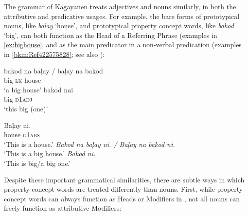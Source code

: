 The grammar of Kagayanen treats adjectives and nouns similarly, in both the attributive and predicative usages. For example, the bare forms of prototypical nouns, like \textit{baļay} ‘house’, and prototypical property concept words, like \textit{bakod} ‘big’, can both function as the Head of a Referring Phrase (examples in \ref{ex:bighouse}, and as the main predicator in a non-verbal predication (examples in \ref{bkm:Ref422575828}; see also ):

\ea 
\label{ex:bighouse}
    \ea
        \gll bakod  na  baļay / baļay na bakod \\
        big  \textsc{lk}  house \\
        \glt ‘a big house’
   \ex 
       \gll bakod nai \\
            big \textsc{d1adj} \\
       \glt ‘this big (one)’
   \z
\z

\ea \label{bkm:Ref422575828} 
    \ea
    \label{bkm:Ref422575828-a}
        \gll Baļay  ni. \\
        house \textsc{d1abs} \\
        \glt ‘This is a house.’
    \ex
    \label{bkm:Ref422575828-b}
        \textit{Bakod na baļay ni. / Baļay na bakod ni.} \\
        ‘This is a big house.’
    \ex
    \label{bkm:Ref422575828-c}
        \textit{Bakod ni.} \\
        ‘This is big/a big one.’
    \z
\z

Despite these important grammatical similarities, there are subtle ways in which property concept words are treated differently than nouns. First, while property concept words can always function as Heads or Modifiers in , not all nouns can freely function as attributive Modifiers:

